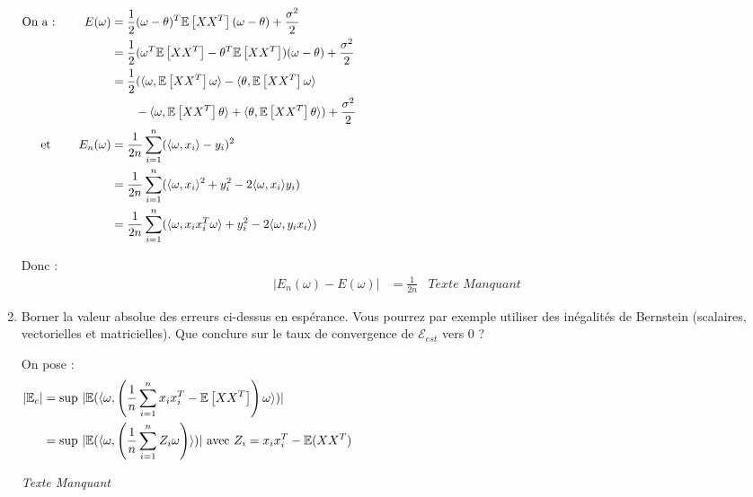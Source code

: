 \documentclass[12pt,a4paper]{article}
\begin{document}
\begin{enumerate}
    \color{blue}
    \begin{align*}
        \text{On a : } \qquad E(\omega) &= \frac{1}{2} (\omega - \theta)^T \mathbb{E} \left[X X^T \right] (\omega - \theta) + \frac{\sigma^2 }{2} \hspace{14.5cm}\\
        &= \frac{1}{2} (\omega^T \mathbb{E} \left[X X^T \right] - \theta^T \mathbb{E} \left[X X^T \right]) (\omega - \theta) + \frac{\sigma^2 }{2} \\
        &= \frac{1}{2} ( \langle \omega, \mathbb{E} \left[X X^T \right] \omega \rangle - \langle \theta, \mathbb{E} \left[X X^T \right] \omega \rangle \\
        &\qquad - \langle \omega, \mathbb{E} \left[X X^T \right] \theta \rangle + \langle \theta, \mathbb{E} \left[X X^T \right] \theta \rangle ) + \frac{\sigma^2 }{2} \\
        \text{et } \qquad E_n(\omega) &= \frac{1}{2n} \sum_{i = 1}^{n} (\langle \omega, x_i \rangle - y_i)^2 \\
        &= \frac{1}{2n} \sum_{i = 1}^{n} (\langle \omega, x_i \rangle^2 + y_i^2 - 2 \langle \omega, x_i \rangle y_i) \\
        &= \frac{1}{2n} \sum_{i = 1}^{n} (\langle \omega, x_i x_i^T \omega \rangle + y_i^2 - 2 \langle \omega, y_i x_i \rangle) \\
    \end{align*}

    Donc :
    \begin{align*}
        |E_n(\omega) - E(\omega)| &= \frac{1}{2n} 
        &\textit{Texte Manquant}
    \end{align*}


    \color{black}
    \item Borner la valeur absolue des erreurs ci-dessus en espérance.
    Vous pourrez par exemple utiliser des inégalités de Bernstein (scalaires, vectorielles et matricielles).
    Que conclure sur le taux de convergence de $\mathcal{E}_{est}$ vers $0$ ?

    \color{blue}
    On pose :
    \begin{align*}
        |\mathbb{E}_c| &= \text{sup } |\mathbb{E}(\langle \omega, \left(\frac{1}{n} \sum_{i = 1}^{n} x_i x_i^T - \mathbb{E}\left[ XX^T \right]\right) \omega \rangle)| \hspace{14.5cm}\\
        &= \text{sup } |\mathbb{E}(\langle \omega, \left(\frac{1}{n} \sum_{i = 1}^{n} Z_i \omega \right) \rangle)| \text{ avec } Z_i = x_i x_i^T - \mathbb{E}(XX^T)
    \end{align*}


\textit{Texte Manquant}

\color{black}    
\end{enumerate}
\end{document}
